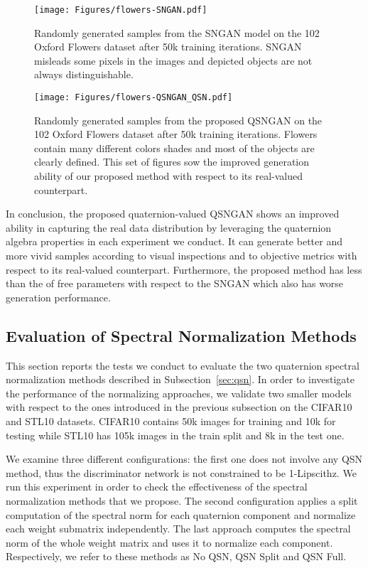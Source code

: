 \documentclass[graybox]{svmult}
\begin{document}
\begin{figure}[t]
    \centering
    \texttt{[image: Figures/flowers-SNGAN.pdf]}
    \caption{Randomly generated samples from the SNGAN model on the 102 Oxford Flowers dataset after 50k training iterations. SNGAN misleads some pixels in the images and depicted objects are not always distinguishable.}
    \label{fig:res_flowers}
\end{figure}

\begin{figure}[t]
    \centering
    \texttt{[image: Figures/flowers-QSNGAN\_QSN.pdf]}
    \caption{Randomly generated samples from the proposed QSNGAN on the 102 Oxford Flowers dataset after 50k training iterations. Flowers contain many different colors shades and most of the objects are clearly defined. This set of figures sow the improved generation ability of our proposed method with respect to its real-valued counterpart.}
    \label{fig:Qres_flowers}
\end{figure}

In conclusion, the proposed quaternion-valued QSNGAN shows an improved ability in capturing the real data distribution by leveraging the quaternion algebra properties in each experiment we conduct. It can generate better and more vivid samples according to visual inspections and to objective metrics with respect to its real-valued counterpart. Furthermore, the proposed method has less than the  of free parameters with respect to the SNGAN which also has worse generation performance.






\subsection{Evaluation of Spectral Normalization Methods}
\noindent This section reports the tests we conduct to evaluate the two quaternion spectral normalization methods described in Subsection~\ref{sec:qsn}. In order to investigate the performance of the normalizing approaches, we validate two smaller models with respect to the ones introduced in the previous subsection on the CIFAR10 and STL10 datasets. CIFAR10 contains 50k  images for training and 10k for testing while STL10 has 105k  images in the train split and 8k in the test one.

We examine three different configurations: the first one does not involve any QSN method, thus the discriminator network is not constrained to be 1-Lipscithz. We run this experiment in order to check the effectiveness of the spectral normalization methods that we propose. The second configuration applies a split computation of the spectral norm for each quaternion component and normalize each weight submatrix  independently. The last approach computes the spectral norm of the whole weight matrix and uses it to normalize each component. Respectively, we refer to these methods as No QSN, QSN Split and QSN Full.
\end{document}
